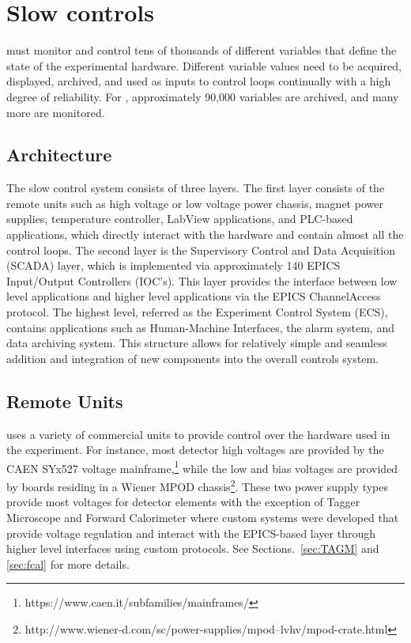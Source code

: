 
\section[Slow controls]{Slow controls \label{sec:controls}}
\GX{} must monitor 
and control tens of thousands of different variables that define the state of the experimental hardware. Different variable values need to be acquired, displayed, archived, and used as inputs to control loops continually with a high degree of reliability. For \gx, approximately 90,000 variables are archived, and many more are monitored.

\subsection{Architecture \label{sec:controlsarchitechture}}
The \gx{} slow control system consists of three layers. The first layer consists of the remote units such as high voltage or low voltage power chassis, magnet power supplies, temperature controller, LabView applications, and PLC-based applications, which directly interact with the hardware and contain almost all the control loops. The second layer is the Supervisory Control and Data Acquisition (SCADA) layer, which is implemented via approximately 140 EPICS Input/Output Controllers (IOC's). This layer provides the interface between low level applications and higher level applications via the EPICS ChannelAccess protocol. The highest level, referred as the Experiment Control System (ECS), contains applications such as Human-Machine Interfaces, the alarm system, and data archiving system. This structure allows for relatively simple and seamless addition and integration of new components into the overall controls system.    

\subsection{Remote Units \label{sec:controlsinterface}}
\gx{} uses a variety of commercial units to provide control over the hardware used in the experiment. For instance, most detector high voltages are provided by the CAEN SYx527 voltage mainframe,\footnote{https://www.caen.it/subfamilies/mainframes/} while the low and bias voltages are provided by boards residing in a Wiener MPOD chassis\footnote{http://www.wiener-d.com/sc/power-supplies/mpod--lvhv/mpod-crate.html}. These two power supply types provide most voltages for detector elements with the exception of Tagger Microscope and Forward Calorimeter where custom systems were developed that provide voltage regulation and interact with the EPICS-based layer through higher level interfaces using custom protocols. See Sections.~\ref{sec:TAGM} and \ref{sec:fcal} for more details.  

